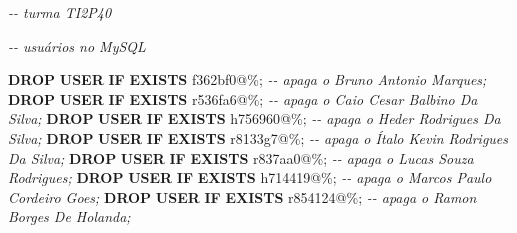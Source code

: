 \documentclass[
]{book}
\newenvironment{Shaded}{\begin{snugshade}}{\end{snugshade}}
\newcommand{\CommentTok}[1]{\textcolor[rgb]{0.56,0.35,0.01}{\textit{#1}}}
\newcommand{\ControlFlowTok}[1]{\textcolor[rgb]{0.13,0.29,0.53}{\textbf{#1}}}
\newcommand{\FunctionTok}[1]{\textcolor[rgb]{0.13,0.29,0.53}{\textbf{#1}}}
\newcommand{\KeywordTok}[1]{\textcolor[rgb]{0.13,0.29,0.53}{\textbf{#1}}}
\newcommand{\NormalTok}[1]{#1}
\newcommand{\StringTok}[1]{\textcolor[rgb]{0.31,0.60,0.02}{#1}}
\begin{document}
\begin{Shaded}
\begin{Highlighting}[]

\CommentTok{{-}{-} turma TI2P40}

\CommentTok{{-}{-} usuários no MySQL}

\KeywordTok{DROP} \FunctionTok{USER} \ControlFlowTok{IF} \KeywordTok{EXISTS} \StringTok{\textquotesingle{}f362bf0\textquotesingle{}}\NormalTok{@}\StringTok{\textquotesingle{}\%\textquotesingle{}}\NormalTok{; }\CommentTok{{-}{-} apaga o \textquotesingle{}Bruno Antonio Marques\textquotesingle{};}
\KeywordTok{DROP} \FunctionTok{USER} \ControlFlowTok{IF} \KeywordTok{EXISTS} \StringTok{\textquotesingle{}r536fa6\textquotesingle{}}\NormalTok{@}\StringTok{\textquotesingle{}\%\textquotesingle{}}\NormalTok{; }\CommentTok{{-}{-} apaga o \textquotesingle{}Caio Cesar Balbino Da Silva\textquotesingle{};}
\KeywordTok{DROP} \FunctionTok{USER} \ControlFlowTok{IF} \KeywordTok{EXISTS} \StringTok{\textquotesingle{}h756960\textquotesingle{}}\NormalTok{@}\StringTok{\textquotesingle{}\%\textquotesingle{}}\NormalTok{; }\CommentTok{{-}{-} apaga o \textquotesingle{}Heder Rodrigues Da Silva\textquotesingle{};}
\KeywordTok{DROP} \FunctionTok{USER} \ControlFlowTok{IF} \KeywordTok{EXISTS} \StringTok{\textquotesingle{}r8133g7\textquotesingle{}}\NormalTok{@}\StringTok{\textquotesingle{}\%\textquotesingle{}}\NormalTok{; }\CommentTok{{-}{-} apaga o \textquotesingle{}Ítalo Kevin Rodrigues Da Silva\textquotesingle{};}
\KeywordTok{DROP} \FunctionTok{USER} \ControlFlowTok{IF} \KeywordTok{EXISTS} \StringTok{\textquotesingle{}r837aa0\textquotesingle{}}\NormalTok{@}\StringTok{\textquotesingle{}\%\textquotesingle{}}\NormalTok{; }\CommentTok{{-}{-} apaga o \textquotesingle{}Lucas Souza Rodrigues\textquotesingle{};}
\KeywordTok{DROP} \FunctionTok{USER} \ControlFlowTok{IF} \KeywordTok{EXISTS} \StringTok{\textquotesingle{}h714419\textquotesingle{}}\NormalTok{@}\StringTok{\textquotesingle{}\%\textquotesingle{}}\NormalTok{; }\CommentTok{{-}{-} apaga o \textquotesingle{}Marcos Paulo Cordeiro Goes\textquotesingle{};}
\KeywordTok{DROP} \FunctionTok{USER} \ControlFlowTok{IF} \KeywordTok{EXISTS} \StringTok{\textquotesingle{}r854124\textquotesingle{}}\NormalTok{@}\StringTok{\textquotesingle{}\%\textquotesingle{}}\NormalTok{; }\CommentTok{{-}{-} apaga o \textquotesingle{}Ramon Borges De Holanda\textquotesingle{};}



\end{Highlighting}
\end{Shaded}
\end{document}
